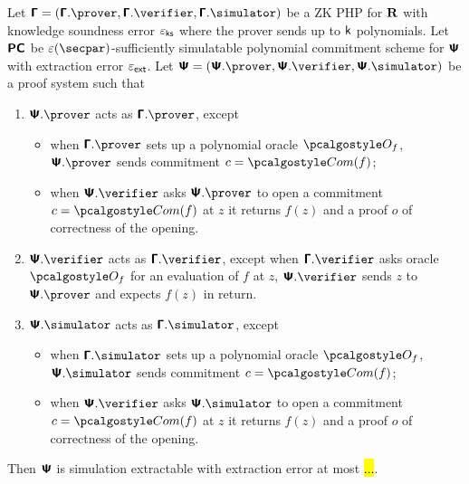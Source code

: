 \documentclass[runningheads,11pt]{llncs}
\begin{document}
\begin{theorem}
  Let $\PHP = (\PHP.\prover, \PHP.\verifier, \PHP.\simulator)$ be a ZK PHP
  for $\mathbf{R}$ with knowledge soundness error $\varepsilon_{\mathsf{ks}}$ where the prover sends up
  to $\mathsf{k}$ polynomials. Let $\bm{\mathsf{PC}}$ be $\eps(\secpar)$-sufficiently
  simulatable polynomial commitment scheme for $\bm{\mathsf{\Psi}}$ with extraction error
  $\varepsilon_{\mathsf{ext}}$. Let $\PS = (\PS.\prover, \PS.\verifier, \PS.\simulator)$ be a proof system such
  that
  \begin{enumerate}
  \item $\PS.\prover$ acts as $\PHP.\prover$, except
    \begin{itemize}
    \item when $\PHP.\prover$ sets up a polynomial oracle $\oracleo_f$,
      $\PS.\prover$ sends commitment $c = \com(f)$;
    \item when $\PS.\verifier$ asks $\PS.\prover$ to open a commitment
      $c = \com(f)$ at $z$ it returns $f(z)$ and a proof $o$ of correctness of
      the opening.
  \end{itemize}
  \item $\PS.\verifier$ acts as $\PHP.\verifier$, except when $\PHP.\verifier$
    asks oracle $\oracleo_f$ for an evaluation of $f$ at $z$, $\PS.\verifier$
    sends $z$ to $\PS.\prover$ and expects $f(z)$ in return.
  \item $\PS.\simulator$ acts as $\PHP.\simulator$, except
     \begin{itemize}
    \item when $\PHP.\simulator$ sets up a polynomial oracle $\oracleo_f$,
      $\PS.\simulator$ sends commitment $c = \com(f)$;
    \item when $\PS.\verifier$ asks $\PS.\simulator$ to open a commitment
      $c = \com(f)$ at $z$ it returns $f(z)$ and a proof $o$ of correctness of
      the opening.
  \end{itemize}
  \end{enumerate}
  Then $\bm{\mathsf{\Psi}}$ is simulation extractable with extraction error at most \hl{...}.
\end{theorem}
\end{document}
